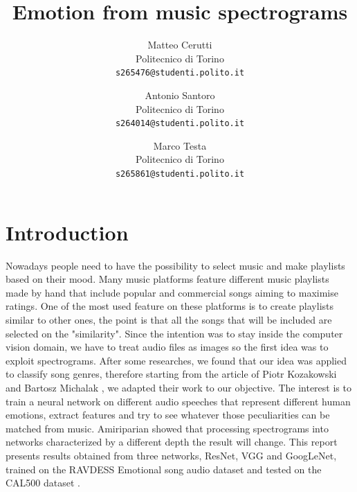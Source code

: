 \documentclass[10pt,twocolumn,letterpaper]{article}
\begin{document}
\title{Emotion from music spectrograms}

\author{Matteo Cerutti\\
Politecnico di Torino\\
{\tt\small s265476@studenti.polito.it}
\and
Antonio Santoro\\
Politecnico di Torino\\
{\tt\small s264014@studenti.polito.it}
\and
Marco Testa\\
Politecnico di Torino\\
{\tt\small s265861@studenti.polito.it}
}


\maketitle

\begin{abstract}
   
\end{abstract}

\section{Introduction}

Nowadays people need to have the possibility to select music and make playlists based on their mood. Many music platforms feature different music playlists made by hand that include popular and commercial songs aiming to maximise ratings. One of the most used feature on these platforms is to create playlists similar to other ones, the point is that all the songs that will be included are selected on the "similarity". 
Since the intention was to stay inside the computer vision domain, we have to treat audio files as images so the first idea was to exploit spectrograms. After some researches, we found that our idea was applied to classify song genres, therefore starting from the article of Piotr Kozakowski and Bartosz Michalak \cite{Kozakowski}, we adapted their work to our objective.
The interest is to train a neural network on different audio speeches that represent different human emotions, extract features and try to see whatever those peculiarities can be matched from music. Amiriparian \etal \cite{Amiriparian} showed that processing spectrograms into networks characterized by a different depth the result will change. This report presents results obtained from three networks, ResNet, VGG and GoogLeNet, trained on the RAVDESS Emotional song audio dataset \cite{Ravdess} and tested on the CAL500 dataset \cite{CAL500}.
\end{document}
